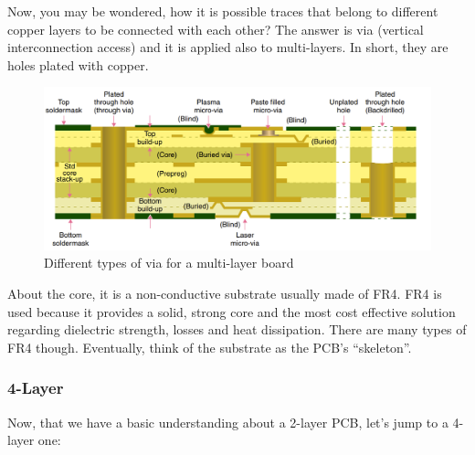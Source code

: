 \documentclass[final]{cubedoc}
\begin{document}
	Now, you may be wondered, how it is possible traces that belong to different copper layers to be connected with each other? The answer is via (vertical interconnection access) and it is applied also to multi-layers. In short, they are holes plated with copper.
	
	\begin{figure}[h!]
		\centering
		\includegraphics[width=\textwidth, height=.25\textheight]{assets/via.png}
		\caption{Different types of via for a multi-layer board \cite[p.4]{mitzner2011complete}}
	\end{figure}
	
	About the core, it is a non-conductive substrate usually made of FR4. FR4 is used because it provides a solid, strong core and the most cost effective solution regarding dielectric strength, losses and heat dissipation. There are many types of FR4 though. Eventually, think of the substrate as the PCB’s “skeleton”. 
	
	\subsubsection{4-Layer}
	Now, that we have a basic understanding about a 2-layer PCB, let’s jump to a 4-layer one:
	
\end{document}

